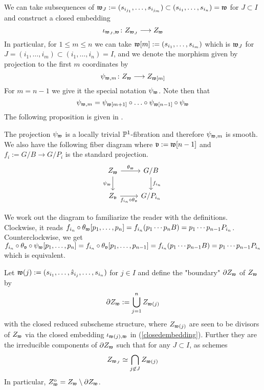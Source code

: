 \documentclass[12pt]{article}
\begin{document}
We can take subsequences of $\mathfrak{w}_J := (s_{i_{j_1}}, \ldots, s_{i_{j_m}}) \subset (s_{i_1}, \ldots, s_{i_n}) = \mathfrak{w}$ for $J \subset I$ and construct a closed embedding 
\begin{equation}\label{closedembedding}
    \iota_{\mathfrak{w}_J, \mathfrak{w}} \colon Z_{\mathfrak{w}_J} \longrightarrow Z_{\mathfrak{w}}
\end{equation} 
In particular, for $1 \leq m \leq n$ we can take $\mathfrak{w}[m] := (s_{i_1}, \ldots, s_{i_m})$ which is $\mathfrak{w}_J$ for $J = (i_1,\ldots,i_m) \subset (i_1,\ldots,i_n) = I$, and we denote the morphism given by projection to the first $m$ coordinates by
\[\psi_{\mathfrak{w}, m} \colon Z_{\mathfrak{w}} \longrightarrow Z_{\mathfrak{w}[m]}\]
For $m = n-1$ we give it the special notation $\psi_{\mathfrak{w}}$. Note then that
\[\psi_{\mathfrak{w}, m} = \psi_{\mathfrak{w}[m+1]}\circ\ldots \circ\psi_{\mathfrak{w}[n-1]}\circ \psi_{\mathfrak{w}}\]
The following proposition is given in \cite{Brion2004FrobeniusSM}.
\begin{prop}
    The projection $\psi_{\mathfrak{w}}$ is a locally trivial $\mathbb{P}^1$-fibration and therefore $\psi_{\mathfrak{w},m}$ is smooth. We also have the following fiber diagram where $\mathfrak{v} := \mathfrak{w}[n-1]$ and $f_{i} := G/B \to G/P_{i}$ is the standard projection.
    \[\begin{tikzcd}
	{Z_{\mathfrak{w}}} & {G/B} \\
	{Z_{\mathfrak{v}}} & {G/P_{i_n}}
	\arrow["{\theta_{\mathfrak{w}}}", from=1-1, to=1-2]
	\arrow["{\psi_{\mathfrak{w}}}"', from=1-1, to=2-1]
	\arrow["f_{i_n}", from=1-2, to=2-2]
	\arrow["{f_{i_n}\circ \theta_{\mathfrak{v}}}"', from=2-1, to=2-2]
\end{tikzcd}\]
\end{prop}
We work out the diagram to familiarize the reader with the definitions. Clockwise, it reads $f_{i_n} \circ \theta_{\mathfrak{w}}[p_1,\ldots,p_n] = f_{i_n}(p_1\cdots p_n B) = p_1\cdots p_{n-1} P_{i_n}$. Counterclockwise, we get $f_{i_n} \circ \theta_{\mathfrak{v}} \circ \psi_{\mathfrak{w}}[p_1,\ldots,p_n] = f_{i_n} \circ \theta_{\mathfrak{v}}[p_1,\ldots,p_{n-1}] = f_{i_n}(p_1\cdots p_{n-1} B) = p_1\cdots p_{n-1} P_{i_n}$ which is equivalent.

Let $\mathfrak{w}(j) := (s_{i_1}, \ldots, \hat{s}_{i_j}, \ldots, s_{i_n})$ for $j \in I$ and define the "boundary" $\partial Z_{\mathfrak{w}}$ of $Z_{\mathfrak{w}}$ by
\[\partial Z_{\mathfrak{w}} := \bigcup_{j=1}^n Z_{\mathfrak{w}(j)}\]
with the closed reduced subscheme structure, where $Z_{\mathfrak{w}(j)}$ are seen to be divisors of $Z_{\mathfrak{w}}$ via the closed embedding $\iota_{\mathfrak{w}(j), \mathfrak{w}}$ in (\ref{closedembedding}). Further they are the irreducible components of $\partial Z_{\mathfrak{w}}$ such that for any $J \subset I$, as schemes
\[Z_{\mathfrak{w}_J} \simeq \bigcap_{j \not \in J} Z_{\mathfrak{w}(j)}\]
In particular, $Z^{\mathrm{o}}_{\mathfrak{w}} = Z_{\mathfrak{w}} \setminus \partial Z_{\mathfrak{w}}$.
\end{document}
